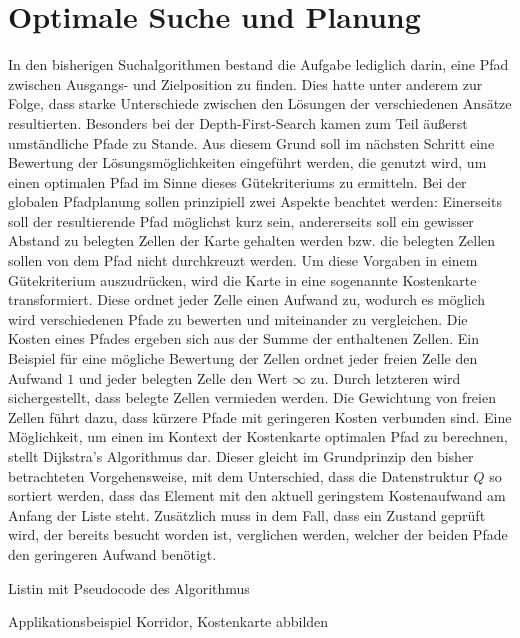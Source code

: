 \section{Optimale Suche und Planung}
In den bisherigen Suchalgorithmen bestand die Aufgabe lediglich darin, eine Pfad zwischen Ausgangs- und Zielposition zu finden. Dies hatte unter anderem zur Folge, dass starke Unterschiede zwischen den Lösungen der verschiedenen Ansätze resultierten. Besonders bei der Depth-First-Search kamen zum Teil äußerst umständliche Pfade zu Stande. Aus diesem Grund soll im nächsten Schritt eine Bewertung der Lösungsmöglichkeiten eingeführt werden, die genutzt wird, um einen optimalen Pfad im Sinne dieses Gütekriteriums zu ermitteln. Bei der globalen Pfadplanung sollen prinzipiell zwei Aspekte beachtet werden: Einerseits soll der resultierende Pfad möglichst kurz sein, andererseits soll ein gewisser Abstand zu belegten Zellen der Karte gehalten werden bzw. die belegten Zellen sollen von dem Pfad nicht durchkreuzt werden. Um diese Vorgaben in einem Gütekriterium auszudrücken, wird die Karte in eine sogenannte Kostenkarte transformiert. Diese ordnet jeder Zelle einen Aufwand zu, wodurch es möglich wird verschiedenen Pfade zu bewerten und miteinander zu vergleichen. Die Kosten eines Pfades ergeben sich aus der Summe der enthaltenen Zellen. Ein Beispiel für eine mögliche Bewertung der Zellen ordnet jeder freien Zelle den Aufwand $1$ und jeder belegten Zelle den Wert $\infty$ zu. Durch letzteren wird sichergestellt, dass belegte Zellen vermieden werden. Die Gewichtung von freien Zellen führt dazu, dass kürzere Pfade mit geringeren Kosten verbunden sind. Eine Möglichkeit, um einen im Kontext der Kostenkarte optimalen Pfad zu berechnen, stellt Dijkstra's Algorithmus dar. Dieser gleicht im Grundprinzip den bisher betrachteten Vorgehensweise, mit dem Unterschied, dass die Datenstruktur $Q$ so sortiert werden, dass das Element mit den aktuell geringstem Kostenaufwand am Anfang der Liste steht. Zusätzlich muss in dem Fall, dass ein Zustand geprüft wird, der bereits besucht worden ist, verglichen werden, welcher der beiden Pfade den geringeren Aufwand benötigt.

{\color{red} Listin mit Pseudocode des Algorithmus}

{\color{red} Applikationsbeispiel Korridor, Kostenkarte abbilden}

